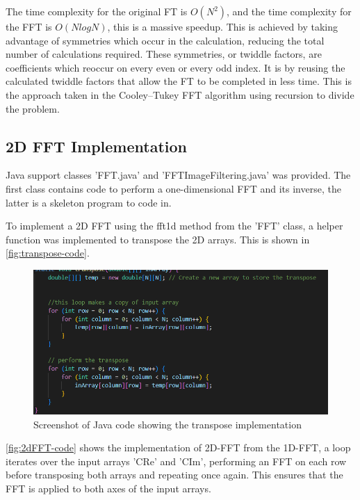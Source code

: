 The time complexity for the original FT is $O(N^2)$, and the time complexity for the FFT is $O(N log N)$, this is a massive speedup. 
This is achieved by taking advantage of symmetries which occur in the calculation, reducing the total number of calculations required. These symmetries, or twiddle factors, are coefficients which reoccur on every even or every odd index. It is by reusing the calculated twiddle factors that allow the FT to be completed in less time. This is the approach taken in the  Cooley–Tukey FFT algorithm using recursion to divide the problem.

\subsection{2D FFT Implementation}

Java support classes 'FFT.java' and 'FFTImageFiltering.java' was provided. The first class contains code to perform a one-dimensional FFT and its inverse, the latter is a skeleton program to code in. 

To implement a 2D FFT using the fft1d method from the 'FFT' class, a helper function was implemented to transpose the 2D arrays. This is shown in \autoref{fig:transpose-code}. 

    \begin{figure}[H] 
        \centering
        \includegraphics[width=0.8\columnwidth]{Figures/Week 2/Transpose Implementation.png}
        \caption{Screenshot of Java code showing the transpose implementation}
        \label{fig:transpose-code}
    \end{figure}

\autoref{fig:2dFFT-code} shows the implementation of 2D-FFT from the 1D-FFT, a loop iterates over the input arrays 'CRe' and 'CIm', performing an FFT on each row before transposing both arrays and repeating once again. This ensures that the FFT is applied to both axes of the input arrays.

